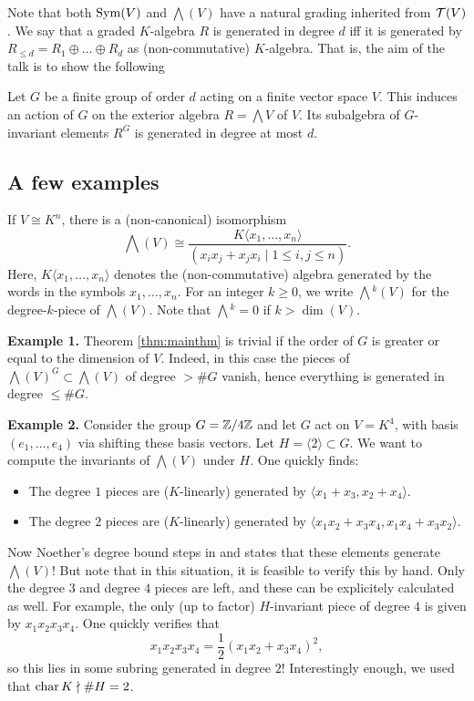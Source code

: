 \documentclass[../main.tex]{subfiles}
\begin{document}
Note that both $\operatorname{Sym}(V)$ and $\bigwedge(V)$ have a natural grading inherited from
$\mathcal{T}(V)$. 
We say that a graded $K$-algebra $R$ is generated in degree $d$ iff it is
generated by $R_{\leq d} = R_1 \oplus \dots \oplus R_d$ as (non-commutative)
$K$-algebra.  That is, the aim of the talk is to show the following 
\begin{thm}\label{thm:mainthm}
    Let $G$ be a finite group of order $d$ acting on a finite vector space $V$.
    This induces an action of $G$ on the exterior algebra $R = \bigwedge V$ of $V$.
    Its subalgebra of $G$-invariant elements $R^G$ is generated in
    degree at most $d$.
\end{thm}

\subsection{A few examples} %
\label{sub:Some examples}
If $V \cong K^n$, there is a (non-canonical) isomorphism
\begin{equation*}
    \bigwedge(V) \cong \frac{K\langle x_1, \dots, x_n \rangle}{(x_i x_j + x_j
    x_i \mid 1 \leq i,j \leq n)}.
\end{equation*}
Here, $K\langle x_1, \dots, x_n \rangle$ denotes the (non-commutative) algebra generated
by the words in the symbols $x_1, \dots, x_n$.
For an integer $k \geq 0$, we write $\bigwedge{}^k(V)$ for the degree-$k$-piece of 
$\bigwedge(V)$. Note that $\bigwedge{}^k = 0$ if $k > \dim(V)$. 

\textbf{Example 1.} Theorem \ref{thm:mainthm} is trivial if the order of $G$ is greater
or equal to the dimension of $V$. Indeed, in this case the pieces of
$\bigwedge(V)^G \subset \bigwedge(V)$ of degree $>\# G$ vanish, hence
everything is generated in degree $\leq \# G$.

\textbf{Example 2.} Consider the group $G = \mathbb{Z}/4\mathbb{Z}$ and let $G$ act on 
$V = K^4$, with basis $(e_1, \dots, e_4)$ via shifting these basis vectors.
Let $H = \langle 2 \rangle \subset G$. We want to compute the invariants of
$\bigwedge(V)$ under $H$. One quickly finds:
\begin{itemize}
    \item The degree $1$ pieces are ($K$-linearly) generated by $\langle x_1 +
        x_3, x_2 + x_4 \rangle$.
    \item The degree $2$ pieces are ($K$-linearly) generated by $\langle x_1
        x_2 + x_3x_4 , x_1 x_4 + x_3x_2\rangle.$
\end{itemize}
Now Noether's degree bound steps in and states that these elements generate
$\bigwedge(V)$! But note that in this situation, it is feasible to verify this 
by hand. Only the degree $3$ and degree $4$ pieces are left, and these can be 
explicitely calculated as well. For example, the only (up to factor) 
$H$-invariant piece of degree $4$ is given by $x_1 x_2 x_3 x_4$. One quickly
verifies that 
\begin{equation*}
    x_1 x_2 x_3 x_4 = \frac 12 (x_1 x_2 + x_3 x_4)^2,
\end{equation*}
so this lies in some subring generated in degree $2$! Interestingly enough, we 
used that $\operatorname{char} K \nmid \# H = 2$.
\end{document}
